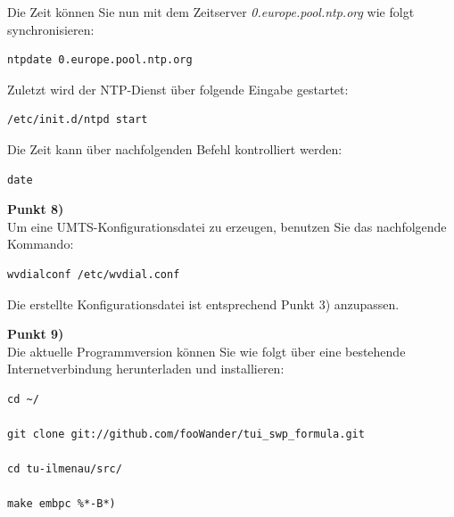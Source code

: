 \documentclass[fontsize = 12pt, paper = a4]{scrreprt}
\begin{document}
Die Zeit können Sie nun mit dem Zeitserver \textit{0.europe.pool.ntp.org} wie folgt synchronisieren:

\vspace*{4mm}
\begin{lstlisting}[frame=single]
ntpdate 0.europe.pool.ntp.org
\end{lstlisting} 
\vspace*{-2mm}

Zuletzt wird der NTP-Dienst über folgende Eingabe gestartet: 

\vspace*{4mm}
\begin{lstlisting}[frame=single]
/etc/init.d/ntpd start
\end{lstlisting} 
\vspace*{-2mm}

Die Zeit kann über nachfolgenden Befehl kontrolliert werden:

\vspace*{4mm}
\begin{lstlisting}[frame=single]
date
\end{lstlisting} 
\vspace*{-2mm}

\textbf{Punkt 8)} \\

Um eine UMTS-Konfigurationsdatei zu erzeugen, benutzen Sie das nachfolgende Kommando:

\vspace*{3mm}
\begin{lstlisting}[frame=single]
wvdialconf /etc/wvdial.conf
\end{lstlisting} 
\vspace*{-2mm}

Die erstellte Konfigurationsdatei ist entsprechend Punkt 3) anzupassen.

\newpage

\textbf{Punkt 9)} \\

Die aktuelle Programmversion können Sie wie folgt über eine bestehende Internetverbindung herunterladen und installieren:

\vspace*{4mm}
\begin{lstlisting}[frame=single]
cd ~/
 
git clone git://github.com/fooWander/tui_swp_formula.git

cd tu-ilmenau/src/

make embpc %*-B*)
\end{lstlisting} 
\vspace*{-2mm}
\end{document}
